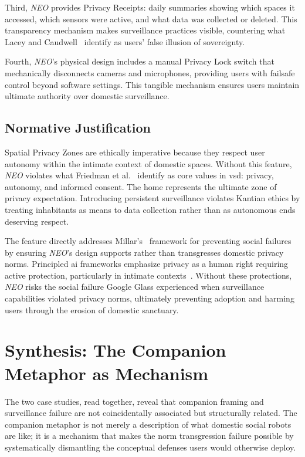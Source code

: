\documentclass[11pt,showkeys]{../../shared/essay}
\newcommand{\neo}{\textit{NEO}}
\begin{document}
Third, \neo{} provides Privacy Receipts: daily summaries showing which spaces it accessed, which sensors were active, and what data was collected or deleted. This transparency mechanism makes surveillance practices visible, countering what Lacey and Caudwell~\cite{lacey_cuteness_2019} identify as users' false illusion of sovereignty.

Fourth, \neo{}'s physical design includes a manual Privacy Lock switch that mechanically disconnects cameras and microphones, providing users with failsafe control beyond software settings. This tangible mechanism ensures users maintain ultimate authority over domestic surveillance.

\subsection{Normative Justification}

Spatial Privacy Zones are ethically imperative because they respect user autonomy within the intimate context of domestic spaces. Without this feature, \neo{} violates what Friedman et al.~\cite{friedman_value_2013} identify as core values in \gls{vsd}: privacy, autonomy, and informed consent. The home represents the ultimate zone of privacy expectation. Introducing persistent surveillance violates Kantian ethics by treating inhabitants as means to data collection rather than as autonomous ends deserving respect.

The feature directly addresses Millar's~\cite{millar_social_2020} framework for preventing social failures by ensuring \neo{}'s design supports rather than transgresses domestic privacy norms. Principled \gls{ai} frameworks emphasize privacy as a human right requiring active protection, particularly in intimate contexts~\cite{fjeld_principled_2020}. Without these protections, \neo{} risks the social failure Google Glass experienced when surveillance capabilities violated privacy norms, ultimately preventing adoption and harming users through the erosion of domestic sanctuary.

\section{Synthesis: The Companion Metaphor as Mechanism}
\label{sec:synthesis}

The two case studies, read together, reveal that companion framing and surveillance failure are not coincidentally associated but structurally related. The companion metaphor is not merely a description of what domestic social robots are like; it is a mechanism that makes the norm transgression failure possible by systematically dismantling the conceptual defenses users would otherwise deploy.
\end{document}
